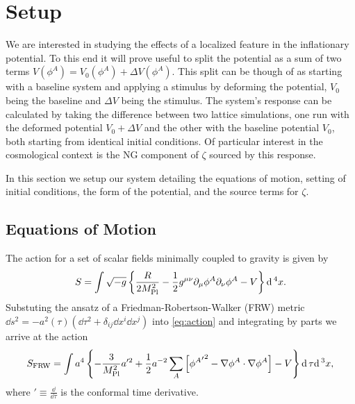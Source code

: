 
\section{Setup} \label{sec:setup}
We are interested in studying the effects of a localized feature in the inflationary potential.
To this end it will prove useful to split the potential as a sum of two terms $V(\phi^A) = V_0(\phi^A) + \Delta V(\phi^A)$.
This split can be though of as starting with a baseline system and applying a stimulus by deforming the potential, $V_0$ being the baseline and $\Delta V$ being the stimulus.
The system's response can be calculated by taking the difference between two lattice simulations, one run with the deformed potential $V_0+\Delta V$ and the other with the baseline potential $V_0$, both starting from identical initial conditions.
Of particular interest in the cosmological context is the NG component of $\zeta$ sourced by this response.

In this section we setup our system detailing the equations of motion, setting of initial conditions, the form of the potential, and the source terms for $\zeta$.

\subsection{Equations of Motion}

The action for a set of scalar fields minimally coupled to gravity is given by
\begin{equation} \label{eq:action}
  S = \int \sqrt{-g}\left\{\frac{R}{2M_{\mathrm{Pl}}^2} - \frac{1}{2}g^{\mu\nu}\partial_\mu\phi^A\partial_\nu\phi^A - V \right\}\mathrm{d}\,^4x.
\end{equation} 
Substuting the ansatz of a Friedman-Robertson-Walker (FRW) metric $\dd s^2 = -a^2(\tau)\left( \dd\tau^2 + \delta_{ij}\dd x^i\dd x^j \right)$ into \eqref{eq:action} and integrating by parts we arrive at the action
\begin{equation} \label{eq:actionFRW}
  S_{\mathrm{FRW}} = \int a^4\left\{
  - \frac{3}{M_{\mathrm{Pl}}^2}a'^2
  + \frac{1}{2}a^{-2}\sum_A\left[{{\phi^A}'}^2
  - \nabla\phi^A\cdot\nabla\phi^A\right]
  - V
  \right\}\mathrm{d}\,\tau\mathrm{d}\,^3x,
\end{equation}
where ${}' \equiv \frac{\dd}{\dd\tau}$ is the conformal time derivative.
  
